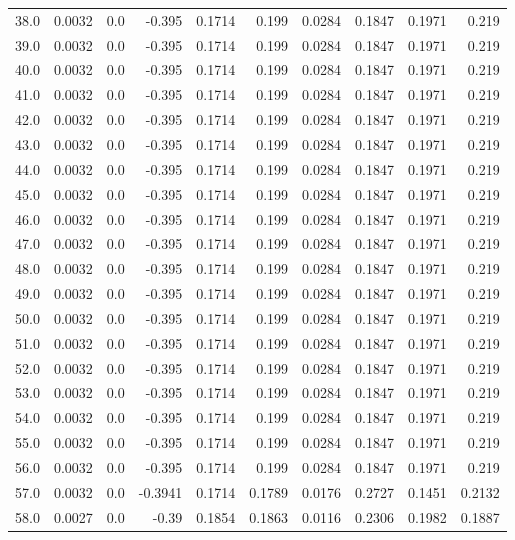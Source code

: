 \begin{longtable}{lrrrrrrrrr}
38.0 & 0.0032 & 0.0 & -0.395 & 0.1714 & 0.199 & 0.0284 & 0.1847 & 0.1971 & 0.219 \\
39.0 & 0.0032 & 0.0 & -0.395 & 0.1714 & 0.199 & 0.0284 & 0.1847 & 0.1971 & 0.219 \\
40.0 & 0.0032 & 0.0 & -0.395 & 0.1714 & 0.199 & 0.0284 & 0.1847 & 0.1971 & 0.219 \\
41.0 & 0.0032 & 0.0 & -0.395 & 0.1714 & 0.199 & 0.0284 & 0.1847 & 0.1971 & 0.219 \\
42.0 & 0.0032 & 0.0 & -0.395 & 0.1714 & 0.199 & 0.0284 & 0.1847 & 0.1971 & 0.219 \\
43.0 & 0.0032 & 0.0 & -0.395 & 0.1714 & 0.199 & 0.0284 & 0.1847 & 0.1971 & 0.219 \\
44.0 & 0.0032 & 0.0 & -0.395 & 0.1714 & 0.199 & 0.0284 & 0.1847 & 0.1971 & 0.219 \\
45.0 & 0.0032 & 0.0 & -0.395 & 0.1714 & 0.199 & 0.0284 & 0.1847 & 0.1971 & 0.219 \\
46.0 & 0.0032 & 0.0 & -0.395 & 0.1714 & 0.199 & 0.0284 & 0.1847 & 0.1971 & 0.219 \\
47.0 & 0.0032 & 0.0 & -0.395 & 0.1714 & 0.199 & 0.0284 & 0.1847 & 0.1971 & 0.219 \\
48.0 & 0.0032 & 0.0 & -0.395 & 0.1714 & 0.199 & 0.0284 & 0.1847 & 0.1971 & 0.219 \\
49.0 & 0.0032 & 0.0 & -0.395 & 0.1714 & 0.199 & 0.0284 & 0.1847 & 0.1971 & 0.219 \\
50.0 & 0.0032 & 0.0 & -0.395 & 0.1714 & 0.199 & 0.0284 & 0.1847 & 0.1971 & 0.219 \\
51.0 & 0.0032 & 0.0 & -0.395 & 0.1714 & 0.199 & 0.0284 & 0.1847 & 0.1971 & 0.219 \\
52.0 & 0.0032 & 0.0 & -0.395 & 0.1714 & 0.199 & 0.0284 & 0.1847 & 0.1971 & 0.219 \\
53.0 & 0.0032 & 0.0 & -0.395 & 0.1714 & 0.199 & 0.0284 & 0.1847 & 0.1971 & 0.219 \\
54.0 & 0.0032 & 0.0 & -0.395 & 0.1714 & 0.199 & 0.0284 & 0.1847 & 0.1971 & 0.219 \\
55.0 & 0.0032 & 0.0 & -0.395 & 0.1714 & 0.199 & 0.0284 & 0.1847 & 0.1971 & 0.219 \\
56.0 & 0.0032 & 0.0 & -0.395 & 0.1714 & 0.199 & 0.0284 & 0.1847 & 0.1971 & 0.219 \\
57.0 & 0.0032 & 0.0 & -0.3941 & 0.1714 & 0.1789 & 0.0176 & 0.2727 & 0.1451 & 0.2132 \\
58.0 & 0.0027 & 0.0 & -0.39 & 0.1854 & 0.1863 & 0.0116 & 0.2306 & 0.1982 & 0.1887 \\

\end{longtable}
